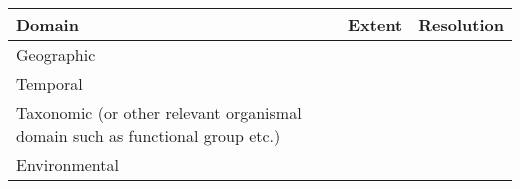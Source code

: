 \documentclass[]{article}
\begin{document}
\begin{longtable}[]{@{}lll@{}}
\toprule
\begin{minipage}[b]{0.05\columnwidth}\raggedright\strut
Domain\strut
\end{minipage} & \begin{minipage}[b]{0.05\columnwidth}\raggedright\strut
Extent\strut
\end{minipage} & \begin{minipage}[b]{0.05\columnwidth}\raggedright\strut
Resolution\strut
\end{minipage}\tabularnewline
\midrule
\endhead
\begin{minipage}[t]{0.05\columnwidth}\raggedright\strut
Geographic\strut
\end{minipage} & \begin{minipage}[t]{0.05\columnwidth}\raggedright\strut
\strut
\end{minipage} & \begin{minipage}[t]{0.05\columnwidth}\raggedright\strut
\strut
\end{minipage}\tabularnewline
\begin{minipage}[t]{0.05\columnwidth}\raggedright\strut
Temporal\strut
\end{minipage} & \begin{minipage}[t]{0.05\columnwidth}\raggedright\strut
\strut
\end{minipage} & \begin{minipage}[t]{0.05\columnwidth}\raggedright\strut
\strut
\end{minipage}\tabularnewline
\begin{minipage}[t]{0.05\columnwidth}\raggedright\strut
Taxonomic (or other relevant organismal domain such as functional group
etc.)\strut
\end{minipage} & \begin{minipage}[t]{0.05\columnwidth}\raggedright\strut
\strut
\end{minipage} & \begin{minipage}[t]{0.05\columnwidth}\raggedright\strut
\strut
\end{minipage}\tabularnewline
\begin{minipage}[t]{0.05\columnwidth}\raggedright\strut
Environmental\strut
\end{minipage} & \begin{minipage}[t]{0.05\columnwidth}\raggedright\strut
\strut
\end{minipage} & \begin{minipage}[t]{0.05\columnwidth}\raggedright\strut
\strut
\end{minipage}\tabularnewline
\bottomrule
\end{longtable}
\end{document}
